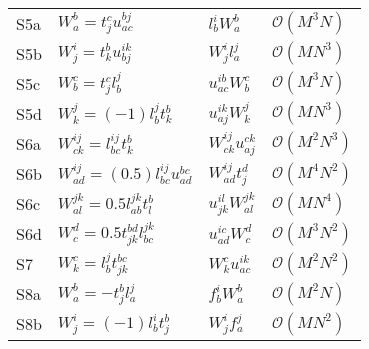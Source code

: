 \begin{center}
\begin{longtable}{@{}llll@{}}
                S5a
                & $W^{b}_{a} = t^{c}_{j} u^{bj}_{ac}$
                & $l^{i}_{b} W^{b}_{a}$
                & $\mathcal{O}(M^3 N)$
                \\

                S5b
                & $W^{i}_{j} = t^{b}_{k} u^{ik}_{bj}$
                & $W^{i}_{j} l^{j}_{a}$
                & $\mathcal{O}(M N^3)$
                \\

                S5c
                & $W^{c}_{b} = t^{c}_{j} l^{j}_{b}$
                & $u^{ib}_{ac} W^{c}_{b}$
                & $\mathcal{O}(M^3 N)$
                \\

                S5d
                & $W^{j}_{k} = (-1) l^{j}_{b} t^{b}_{k}$
                & $u^{ik}_{aj} W^{j}_{k}$
                & $\mathcal{O}(M N^3)$
                \\

                S6a
                & $W^{ij}_{ck} = l^{ij}_{bc} t^{b}_{k}$
                & $W^{ij}_{ck} u^{ck}_{aj}$
                & $\mathcal{O}(M^2 N^3)$
                \\

                S6b
                & $W^{ij}_{ad} = (0.5) l^{ij}_{bc} u^{bc}_{ad}$
                & $W^{ij}_{ad} t^{d}_{j}$
                & $\mathcal{O}(M^4 N^2)$
                \\

                S6c
                & $W^{jk}_{al} = 0.5 l^{jk}_{ab} t^{b}_{l}$
                & $u^{il}_{jk} W^{jk}_{al}$
                & $\mathcal{O}(M N^4)$
                \\

                S6d
                & $W^{d}_{c} = 0.5 t^{bd}_{jk} l^{jk}_{bc}$
                & $u^{ic}_{ad} W^{d}_{c}$
                & $\mathcal{O}(M^3 N^2)$
                \\

                S7
                & $W^{c}_{k} = l^{j}_{b} t^{bc}_{jk}$
                & $W^{c}_{k} u^{ik}_{ac}$
                & $\mathcal{O}(M^2 N^2)$
                \\

                S8a
                & $W^{b}_{a} = -t^{b}_{j} l^{j}_{a}$
                & $f^{i}_{b} W^{b}_{a}$
                & $\mathcal{O}(M^2 N)$
                \\

                S8b
                & $W^{i}_{j} = (-1) l^{i}_{b} t^{b}_{j}$
                & $W^{i}_{j} f^{j}_{a}$
                & $\mathcal{O}(M N^2)$
                \\


\end{longtable}
\end{center}

